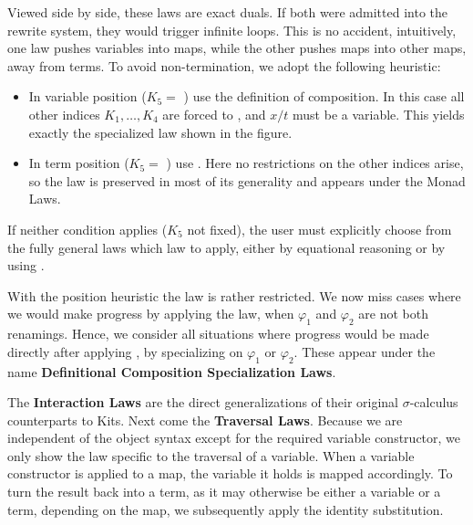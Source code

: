 \documentclass[screen,nonacm]{acmart}
\begin{document}
\noindent\begin{minipage}{0.45\linewidth}
      \raggedright{}
      \ECompGeneral{}
\end{minipage}
\begin{minipage}{0.55\linewidth}
      \raggedright{}
      \ECompoGeneral{}
\end{minipage}

\noindent Viewed side by side, these laws are exact duals. If both were admitted into the
rewrite system, they would trigger infinite loops. This is no accident,
intuitively, one law pushes variables into maps, while the other pushes maps
into other maps, away from terms. To avoid non-termination, we adopt the following heuristic:
\begin{itemize}
      \item In variable position ($K_5 = $ ) use the definition of
            composition. In this case all other indices $K_1,\dots,K_4$ are forced to
            , and $x/t$ must be a variable. This yields exactly the
            specialized  law shown in the figure.
      \item In term position ($K_5 = $ ) use .
            Here no restrictions on the other indices arise, so the law is preserved in
            most of its generality and appears under the Monad Laws.
\end{itemize}

\noindent If neither condition applies ($K_5$ not fixed), the user must explicitly choose from the fully
general laws which law to apply, either by equational reasoning or by using
.

With the position heuristic the  law is rather restricted.
We now miss cases where we would make progress by applying the
 law, when $\varphi_1$ and $\varphi_2$ are not both
renamings. Hence, we consider all situations where progress would be made
directly after applying , by specializing on $\varphi_1$ or
$\varphi_2$. These appear under the name \textbf{Definitional Composition
      Specialization Laws}.

The \textbf{Interaction Laws} are the direct generalizations of their original
$σ$-calculus counterparts to Kits. Next come the \textbf{Traversal Laws}.
Because we are independent of the object syntax except for the required
variable constructor, we only show the law specific to the traversal of a
variable. When a variable constructor is applied to a map, the variable it
holds is mapped accordingly. To turn the result back into a term, as it may
otherwise be either a variable or a term, depending on the map, we subsequently
apply the identity substitution.
\end{document}
